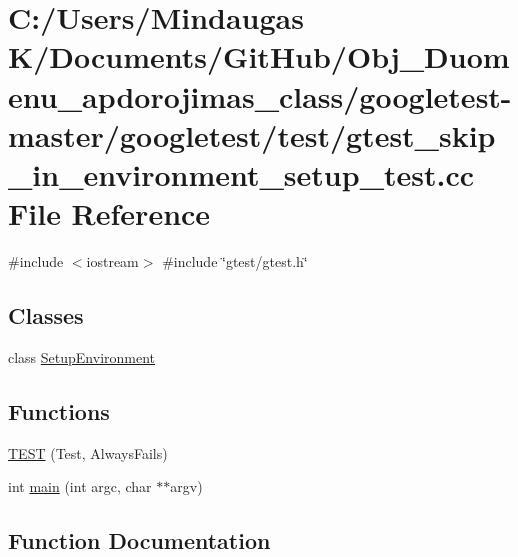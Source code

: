 \hypertarget{googletest-master_2googletest_2test_2gtest__skip__in__environment__setup__test_8cc}{}\section{C\+:/\+Users/\+Mindaugas K/\+Documents/\+Git\+Hub/\+Obj\+\_\+\+Duomenu\+\_\+apdorojimas\+\_\+class/googletest-\/master/googletest/test/gtest\+\_\+skip\+\_\+in\+\_\+environment\+\_\+setup\+\_\+test.cc File Reference}
\label{googletest-master_2googletest_2test_2gtest__skip__in__environment__setup__test_8cc}
{\ttfamily \#include $<$iostream$>$}\newline
{\ttfamily \#include \char`\"{}gtest/gtest.\+h\char`\"{}}\newline
\subsection*{Classes}
\begin{DoxyCompactItemize}
\item 
class \mbox{\hyperlink{class_setup_environment}{Setup\+Environment}}
\end{DoxyCompactItemize}
\subsection*{Functions}
\begin{DoxyCompactItemize}
\item 
\mbox{\hyperlink{googletest-master_2googletest_2test_2gtest__skip__in__environment__setup__test_8cc_a30d5e724bb43125f507beb71b14dd782}{T\+E\+ST}} (Test, Always\+Fails)
\item 
int \mbox{\hyperlink{googletest-master_2googletest_2test_2gtest__skip__in__environment__setup__test_8cc_a3c04138a5bfe5d72780bb7e82a18e627}{main}} (int argc, char $\ast$$\ast$argv)
\end{DoxyCompactItemize}


\subsection{Function Documentation}
\mbox{\label{googletest-master_2googletest_2test_2gtest__skip__in__environment__setup__test_8cc_a3c04138a5bfe5d72780bb7e82a18e627}} 
